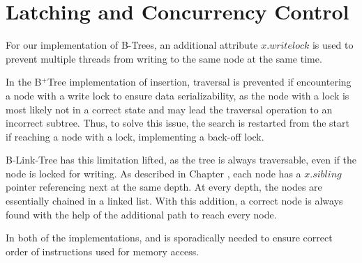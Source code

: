 \section{Latching and Concurrency Control}

For our implementation of B-Trees, an additional attribute $x.writelock$ is used to prevent multiple threads from writing to the same node at the same time.

In the B$^+$Tree implementation of insertion, traversal is prevented if encountering a node with a write lock to ensure data serializability, as the node with a lock is most likely not in a correct state and may lead the traversal operation to an incorrect subtree. Thus, to solve this issue, the search is restarted from the start if reaching a node with a lock, implementing a back-off lock.

B-Link-Tree has this limitation lifted, as the tree is always traversable, even if the node is locked for writing. As described in Chapter , each node has a $x.sibling$ pointer referencing next at the same depth. At every depth, the nodes are essentially chained in a linked list. With this addition, a correct node is always found with the help of the additional path to reach every node.

In both of the implementations,  and  is sporadically needed to ensure correct order of instructions used for memory access.